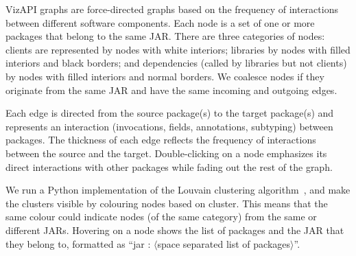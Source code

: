VizAPI graphs are force-directed graphs based on the frequency of
interactions between different software components.  Each node is a
set of one or more packages that belong to the same JAR.  There are
three categories of nodes: clients are represented by nodes with white
interiors; libraries by nodes with filled interiors and black borders;
and dependencies (called by libraries but not clients) by nodes with
filled interiors and normal borders.  We coalesce nodes if they
originate from the same JAR and have the same incoming and
outgoing edges.

Each edge is directed
from the source package(s) to the target package(s) and represents an interaction 
(invocations, fields, annotations, subtyping) between packages. 
The thickness of each edge reflects the frequency of interactions between the source and the target.
Double-clicking on a node emphasizes its direct interactions with other packages while fading out the rest of the graph.

We run a Python implementation of the Louvain clustering algorithm~\cite{blondel2008fast}, and make the clusters 
visible by colouring nodes based on cluster.
This means that the same colour could indicate nodes (of the same category) from the same or different JARs.
Hovering on a node shows the list of packages and 
the JAR that they belong to, 
formatted as “jar : $\langle$space separated list of packages$\rangle$”. 
